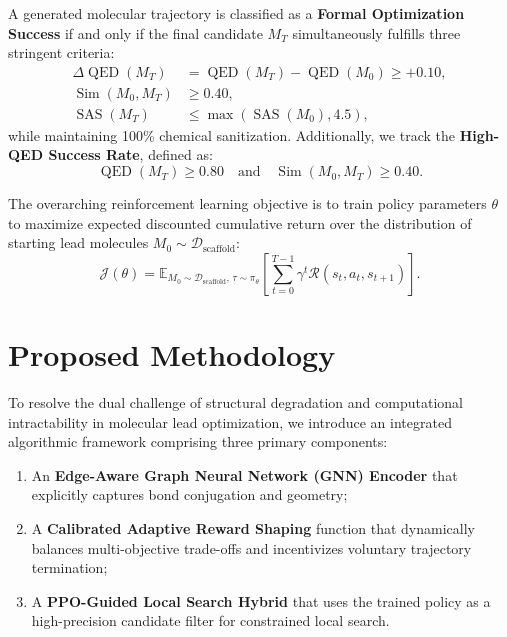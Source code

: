 \documentclass{ieeeaccess}
\begin{document}
A generated molecular trajectory is classified as a \textbf{Formal Optimization Success} if and only if the final candidate $M_T$ simultaneously fulfills three stringent criteria:
\begin{align}
\Delta\operatorname{QED}(M_T) &= \operatorname{QED}(M_T) - \operatorname{QED}(M_0) \ge +0.10, \nonumber\\
\operatorname{Sim}(M_0, M_T) &\ge 0.40, \nonumber\\
\operatorname{SAS}(M_T) &\le \max\left(\operatorname{SAS}(M_0), 4.5\right),
\label{eq:formal_success}
\end{align}
while maintaining 100\% chemical sanitization. Additionally, we track the \textbf{High-QED Success Rate}, defined as:
\begin{equation}
\operatorname{QED}(M_T) \ge 0.80 \quad \text{and} \quad \operatorname{Sim}(M_0, M_T) \ge 0.40.
\label{eq:high_qed_success}
\end{equation}

The overarching reinforcement learning objective is to train policy parameters $\theta$ to maximize expected discounted cumulative return over the distribution of starting lead molecules $M_0 \sim \mathcal{D}_{\text{scaffold}}$:
\begin{equation}
\mathcal{J}(\theta) = \mathbb{E}_{M_0 \sim \mathcal{D}_{\text{scaffold}}, \, \tau \sim \pi_\theta} \left[ \sum_{t=0}^{T-1} \gamma^t \mathcal{R}(s_t, a_t, s_{t+1}) \right].
\label{eq:rl_objective}
\end{equation}


\section{Proposed Methodology}
\label{sec:method}
To resolve the dual challenge of structural degradation and computational intractability in molecular lead optimization, we introduce an integrated algorithmic framework comprising three primary components:
\begin{enumerate}
    \item An \textbf{Edge-Aware Graph Neural Network (GNN) Encoder} that explicitly captures bond conjugation and geometry;
    \item A \textbf{Calibrated Adaptive Reward Shaping} function that dynamically balances multi-objective trade-offs and incentivizes voluntary trajectory termination;
    \item A \textbf{PPO-Guided Local Search Hybrid} that uses the trained policy as a high-precision candidate filter for constrained local search.
\end{enumerate}
\end{document}
